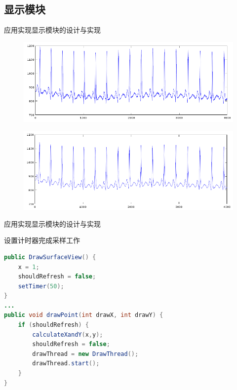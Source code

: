 \documentclass[aspectratio=43,fleqn]{beamer}
\begin{document}
\subsection{显示模块}
\begin{frame}{应用实现}{显示模块的设计与实现}
{\begin{figure}[ht]
	\begin{center}
		\includegraphics[width=\textwidth]{fig4-1a.png}
	\end{center}
\end{figure}}
{\begin{figure}
	\begin{center}
		\includegraphics[width=\textwidth]{fig4-1b.png}
	\end{center}
\end{figure}}
\end{frame}

\begin{frame}[fragile]{应用实现}{显示模块的设计与实现}
\begin{block}{设置计时器完成采样工作}
\begin{center}
\begin{lstlisting}[language=java]
public DrawSurfaceView() { 
    x = 1; 
    shouldRefresh = false;
    setTimer(50);
} 
...
public void drawPoint(int drawX, int drawY) { 
    if (shouldRefresh) { 
        calculateXandY(x,y);
        shouldRefresh = false; 
        drawThread = new DrawThread(); 
        drawThread.start(); 
    } 
}
\end{lstlisting}
\end{center}
\end{block}
\end{frame}
\end{document}

